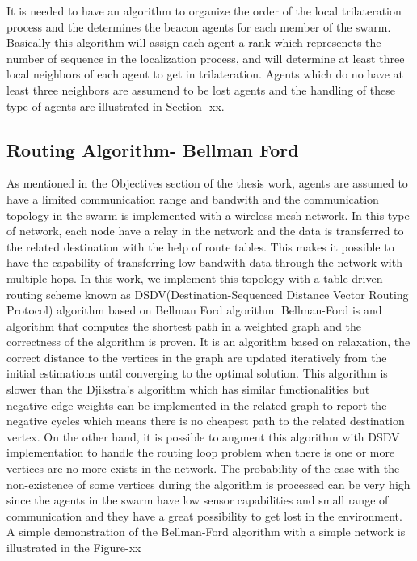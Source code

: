 \documentclass[twoside]{article}
\begin{document}
\begin{multicols}{2}
	It is needed to have an algorithm to organize the order of the local trilateration process and the determines the beacon agents for each member of the swarm. Basically this algorithm will assign each agent a rank which represenets the number of sequence in the localization process, and will determine at least three local neighbors of each agent to get in trilateration. Agents which do no have at least three neighbors are assumend to be lost agents and the handling of these type of agents are illustrated in Section -xx.
	
	\subsection{Routing Algorithm- Bellman Ford}
	As mentioned in the Objectives section of the thesis work, agents are assumed to have a limited communication range and bandwith and the communication topology in the swarm is implemented with a wireless mesh network. In this type of network, each node have a relay in the network and the data is transferred to the related destination with the help of route tables. This makes it possible to have the capability of transferring low bandwith data through the network with multiple hops.  In this work, we implement this topology with a table driven routing scheme known as DSDV(Destination-Sequenced Distance Vector Routing Protocol) algorithm based on Bellman Ford algorithm. Bellman-Ford is and algorithm that computes the shortest path in a weighted graph and the correctness of the algorithm is proven. It is an algorithm based on relaxation, the correct distance to the vertices in the graph are updated iteratively from the initial estimations until converging to the optimal solution. This algorithm is slower than the Djikstra's algorithm which has similar functionalities but negative edge weights can be implemented in the related graph to report the negative cycles which means there is no cheapest path to the related destination vertex. On the other hand, it is possible to augment this algorithm with DSDV implementation to handle the routing loop problem when there is one or more vertices are no more exists in the network. The probability of the case with the non-existence of some vertices during the algorithm is processed can be very high since the agents in the swarm have low sensor capabilities and small range of communication and they have a great possibility to get lost in the environment. A simple demonstration of the Bellman-Ford algorithm with a simple network is illustrated in the Figure-xx
	

\end{multicols}
\end{document}

